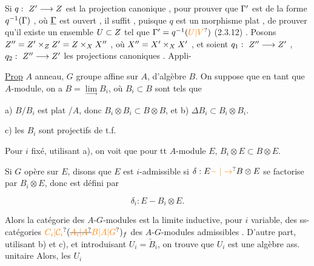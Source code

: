 Si $q:\ Z'\longrightarrow Z$ est la projection canonique , pour prouver que $\Gamma'$ est de la forme  $q^{-1}(\Gamma)$ , où $\underline{\Gamma}$ est ouvert  , il suffit , puisque $q$ est un morphisme  plat  , de prouver  qu'il existe un ensemble $U\subset Z$ tel que $\handwritten{\Gamma}'=q^{-1}(\unsure{U|V})$ (2.3.12) . Posons $Z''=Z'\times_Z Z'=Z\times_X X''$ , où $X''=X'\times_X X'$ , et soient $q_1:\ Z''\longrightarrow Z'$ , $q_2:\ Z''\handwritten{\longrightarrow} Z'$ les projections canoniques . Appli-

\uline{Prop} $A$ anneau, $G$ groupe affine sur $A$, d'algèbre $B$. On suppose que en tant que $A$-module, on a $B=\underset{\longrightarrow}{\lim} B_i$, où $B_i\subset B$ sont tels que

a) $B/B_i$ est plat /$A$,  donc \deleted{$\unsure{\Delta}$} $B_i\otimes B_i\subset B\otimes B$, et b) $\Delta B_i\subset B_i\otimes B_i$.

 c) les $B_i$ sont projectifs de t.f.

 Pour $i$ fixé, utilisant a), on voit que pour tt $A$-module $E$, $B_i\otimes E\subset B\otimes E$.

Si $G$ opère sur $E$, disons que $E$ est $i$-admissible si $\delta:E\unsure{\mathrel{-}|\to} B\otimes E$ se factorise par $B_i\otimes E$, donc est défini par

\[
\delta_i:E\mathrel{-} B_i\otimes E.
\]

Alors la catégorie des $A$-$G$-modules  est la limite inductive, pour $i$ variable, des ss-catégories $\unsure{C_i|\mathcal C_i}(\deleted{\unsure{A_i|A}}\unsure{B|A|G})_f$ des $A$-$G$-modules admissibles . D'autre part, utilisant b) et c), et introduisant $U_i=\check B_i$, on trouve que $U_i$ est une algèbre ass. unitaire
 \deleted{\unsure{non, si} $1\in \unsure{G|B}$ $i$ assez grand pour que $\unsure{\varepsilon}(B_i)=A$,\unsure{\}|]}} \deleted{\unsure{p. ex. pour} $1\in \unsure{B_i|E_i}$\unsure{]}} Alors, les  $U_i$

